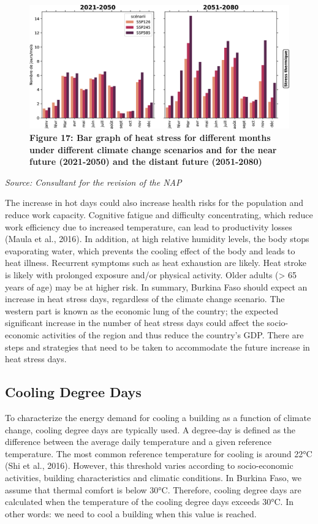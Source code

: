 \documentclass[
]{book}
\begin{document}
\begin{figure}
\centering
\includegraphics{Figures and Photos/Figure 17.png}
\caption{\textbf{Figure 17: Bar graph of heat stress for different months under different climate change scenarios and for the near future (2021-2050) and the distant future (2051-2080)}}
\end{figure}

\emph{Source: Consultant for the revision of the NAP}

The increase in hot days could also increase health risks for the population and reduce work capacity. Cognitive fatigue and difficulty concentrating, which reduce work efficiency due to increased temperature, can lead to productivity losses (Maula et al., 2016). In addition, at high relative humidity levels, the body stops evaporating water, which prevents the cooling effect of the body and leads to heat illness. Recurrent symptoms such as heat exhaustion are likely. Heat stroke is likely with prolonged exposure and/or physical activity. Older adults (\textgreater{} 65 years of age) may be at higher risk. In summary, Burkina Faso should expect an increase in heat stress days, regardless of the climate change scenario. The western part is known as the economic lung of the country; the expected significant increase in the number of heat stress days could affect the socio-economic activities of the region and thus reduce the country's GDP. There are steps and strategies that need to be taken to accommodate the future increase in heat stress days.

\subsection{Cooling Degree Days}\label{cooling-degree-days}

To characterize the energy demand for cooling a building as a function of climate change, cooling degree days are typically used. A degree-day is defined as the difference between the average daily temperature and a given reference temperature. The most common reference temperature for cooling is around 22°C (Shi et al., 2016). However, this threshold varies according to socio-economic activities, building characteristics and climatic conditions. In Burkina Faso, we assume that thermal comfort is below 30°C. Therefore, cooling degree days are calculated when the temperature of the cooling degree days exceeds 30°C. In other words: we need to cool a building when this value is reached.
\end{document}

